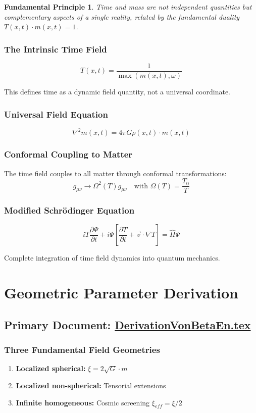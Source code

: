 \documentclass[12pt,a4paper]{report}
\newtheorem{principle}{Fundamental Principle}[chapter]
\begin{document}
	\begin{principle}
		Time and mass are not independent quantities but complementary aspects of a single reality, related by the fundamental duality $T(x,t) \cdot m(x,t) = 1$.
	\end{principle}
	
	\subsubsection{The Intrinsic Time Field}
	$$T(x,t) = \frac{1}{\max(m(x,t), \omega)}$$
	
	This defines time as a dynamic field quantity, not a universal coordinate.
	
	\subsubsection{Universal Field Equation}
	$$\nabla^2 m(x,t) = 4\pi G \rho(x,t) \cdot m(x,t)$$
	
	\subsubsection{Conformal Coupling to Matter}
	The time field couples to all matter through conformal transformations:
	$$g_{\mu\nu} \rightarrow \Omega^2(T) g_{\mu\nu} \quad \text{with } \Omega(T) = \frac{T_0}{T}$$
	
	\subsubsection{Modified Schrödinger Equation}
	$$iT\frac{\partial \Psi}{\partial t} + i\Psi\left[\frac{\partial T}{\partial t} + \vec{v} \cdot \nabla T\right] = \hat{H}\Psi$$
	
	Complete integration of time field dynamics into quantum mechanics.
	
	\section{Geometric Parameter Derivation}
	\subsection{Primary Document: \href{https://github.com/jpascher/T0-Time-Mass-Duality/tree/main/2/pdf/DerivationVonBetaEn.pdf}{DerivationVonBetaEn.tex}}
	
	\subsubsection{Three Fundamental Field Geometries}
	\begin{enumerate}
		\item \textbf{Localized spherical:} $\xi = 2\sqrt{G} \cdot m$
		\item \textbf{Localized non-spherical:} Tensorial extensions
		\item \textbf{Infinite homogeneous:} Cosmic screening $\xi_{eff} = \xi/2$
	\end{enumerate}
	
\end{document}
